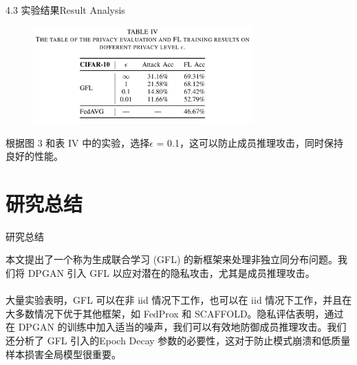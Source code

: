 \documentclass{sintefbeamer}
\theoremstyle{definition}
\begin{document}
\begin{frame}{4.3 实验结果}{Result Analysis}
\begin{figure}[ht]
\centering
	\includegraphics[width=0.75\textwidth]{images/res_table4}
	\end{figure}
	
	根据图 3 和表 IV 中的实验，选择$\epsilon$ = 0.1，这可以防止成员推理攻击，同时保持良好的性能。
\end{frame}



\section{研究总结}

\begin{frame}{研究总结}

本文提出了一个称为生成联合学习 (GFL) 的新框架来处理非独立同分布问题。我们将 DPGAN 引入 GFL 以应对潜在的隐私攻击，尤其是成员推理攻击。
\\ \hspace*{\fill} \\
大量实验表明，GFL 可以在非 iid 情况下工作，也可以在 iid 情况下工作，并且在大多数情况下优于其他框架，如 FedProx 和 SCAFFOLD。隐私评估表明，通过在 DPGAN 的训练中加入适当的噪声，我们可以有效地防御成员推理攻击。我们还分析了 GFL 引入的Epoch Decay 参数的必要性，这对于防止模式崩溃和低质量样本损害全局模型很重要。


\end{frame}



\backmatter
\end{document}
